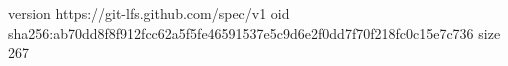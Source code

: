 version https://git-lfs.github.com/spec/v1
oid sha256:ab70dd8f8f912fcc62a5f5fe46591537e5c9d6e2f0dd7f70f218fc0c15e7c736
size 267
